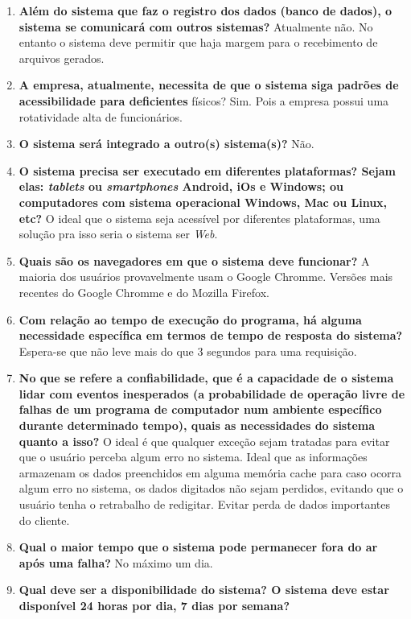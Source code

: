 \begin{enumerate}
 \item \textbf{Além do sistema que faz o registro dos dados (banco de dados), o sistema se comunicará com outros sistemas?}
 	\subitem Atualmente não. No entanto o sistema deve permitir que haja margem para o recebimento de arquivos gerados.
 \item \textbf{A empresa, atualmente, necessita de que o sistema siga padrões de acessibilidade para deficientes }físicos?
 	\subitem Sim. Pois a empresa possui uma rotatividade alta de funcionários.
 \item \textbf{O sistema será integrado a outro(s) sistema(s)?}
 	\subitem Não. 
 \item \textbf{O sistema precisa ser executado em diferentes plataformas? Sejam elas:  \textit{tablets} ou \textit{smartphones} Android, iOs e Windows; ou computadores com sistema operacional Windows, Mac ou Linux, etc?}
 	\subitem O ideal que o sistema seja acessível por diferentes plataformas, uma solução pra isso seria o sistema ser \textit{Web}.
 \item \textbf{Quais são os navegadores em que o sistema deve funcionar?}
 	\subitem A maioria dos usuários provavelmente usam o Google Chromme. Versões mais recentes do Google Chromme e do Mozilla Firefox.
 \item \textbf{Com relação ao tempo de execução do programa, há alguma necessidade específica em termos de tempo de resposta do sistema?}
 	\subitem Espera-se que não leve mais do que 3 segundos para uma requisição.
  \item \textbf{No que se refere a confiabilidade, que é a capacidade de o sistema lidar com eventos inesperados (a probabilidade de operação livre de falhas de um  programa de computador num ambiente específico durante determinado tempo), quais as necessidades do sistema quanto a isso?}
 	\subitem O ideal é que qualquer exceção sejam tratadas para evitar que o usuário perceba algum erro no sistema.
	Ideal que as informações armazenam os dados preenchidos em alguma memória cache para caso ocorra algum erro no sistema, os dados digitados não sejam perdidos, evitando que o usuário tenha o retrabalho de redigitar.
	Evitar perda de dados importantes do cliente.
 \item \textbf{Qual o maior tempo que o sistema pode permanecer fora do ar após uma falha?}
 	\subitem No máximo um dia.
 \item \textbf{Qual deve ser a disponibilidade do sistema? O sistema deve estar disponível 24 horas por dia, 7 dias por semana?}

\end{enumerate}
